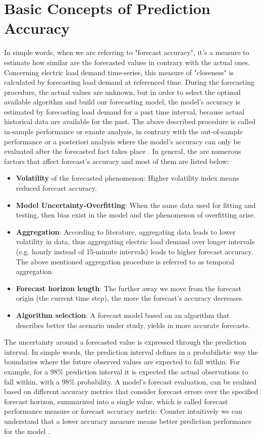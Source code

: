 \section{Basic Concepts of Prediction Accuracy}
In simple words, when we are referring to "forecast accuracy", it's a measure to estimate how similar are the forecasted values in contrary with the actual ones. Concerning electric load demand time-series, this measure of "closeness" is calculated by forecasting load demand at referenced time. 
During the forecasting procedure, the actual values are unknown, but in order to select the optimal available algorithm and build our forecasting model, the model's accuracy is estimated by forecasting load demand for a past time interval, because actual historical data are available for the past. The above described procedure is called in-sample performance or exante analysis, in contrary with the out-of-sample performance or a posteriori analysis where the model's accuracy can only be evaluated after the forecasted fact takes place \cite{geron2019hands}.
In general, the are numerous factors that affect forecast's accuracy and most of them are listed below: 
\begin{itemize}
    \item \textbf{Volatility} of the forecasted phenomenon:
    Higher volatility index means reduced forecast accuracy.
    \item \textbf{Model Uncertainty-Overfitting}: When the same data used for fitting and testing, then bias exist in the model and the phenomenon of overfitting arise.
    \item \textbf{Aggregation}: According to literature, aggregating data leads to lower volatility in data, thus aggregating electric load demand over longer intervals (e.g. hourly instead of 15-minute intervals) leads to higher forecast accuracy. The above mentioned  aggregation procedure is referred to as temporal aggregation.
    \item \textbf{Forecast horizon length}: The further away we move from the forecast origin (the current time step), the more the forecast's accuracy decreases.
    \item \textbf{Algorithm selection}: A forecast model based on an algorithm that describes better the scenario under study, yields in more accurate forecasts.
\end{itemize}
The uncertainty around a forecasted value is expressed through the prediction interval. In simple words, the prediction interval defines in a probabilistic way the boundaries where the future observed values are expected to fall within. For example, for a 98\% prediction interval it is expected the actual observations to fall within, with a 98\% probability. A model's forecast evaluation, can be realized based on different accuracy metrics that consider forecast errors over the specified forecast horizon, summarized into a single value, which is called forecast performance measure or forecast accuracy metric. Counter intuitively we can understand that a lower accuracy measure means better prediction performance for the model \cite{armstrong1995correspondence}.
\newpage

